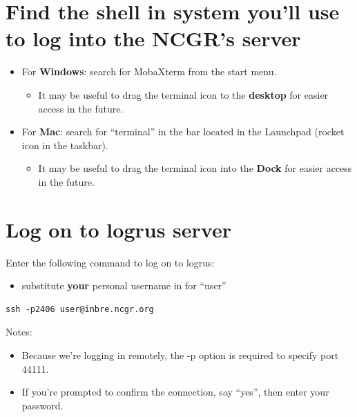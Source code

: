 \documentclass[
]{book}
\providecommand{\tightlist}{%
  \setlength{\itemsep}{0pt}\setlength{\parskip}{0pt}}
\begin{document}
\hypertarget{find-the-shell-in-system-youll-use-to-log-into-the-ncgrs-server}{%
\section{Find the shell in system you'll use to log into the NCGR's server}\label{find-the-shell-in-system-youll-use-to-log-into-the-ncgrs-server}}

\begin{itemize}
\tightlist
\item
  For \textbf{Windows}: search for MobaXterm from the start menu.

  \begin{itemize}
  \tightlist
  \item
    It may be useful to drag the terminal icon to the \textbf{desktop} for easier access in the future.
  \end{itemize}
\item
  For \textbf{Mac}: search for ``terminal'' in the bar located in the Launchpad (rocket icon in the taskbar).

  \begin{itemize}
  \tightlist
  \item
    It may be useful to drag the terminal icon into the \textbf{Dock} for easier access in the future.
  \end{itemize}
\end{itemize}

\hypertarget{log-on-to-logrus-server}{%
\section{Log on to logrus server}\label{log-on-to-logrus-server}}

Enter the following command to log on to logrus:

\begin{itemize}
\tightlist
\item
  substitute \textbf{your} personal username in for ``user''
\end{itemize}

\begin{verbatim}
ssh -p2406 user@inbre.ncgr.org
\end{verbatim}

Notes:

\begin{itemize}
\tightlist
\item
  Because we're logging in remotely, the -p option is required to specify port 44111.
\item
  If you're prompted to confirm the connection, say ``yes'', then enter your password.
\end{itemize}
\end{document}
